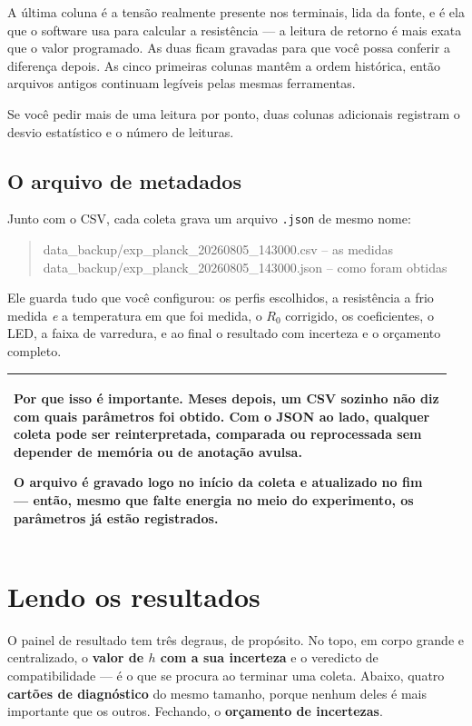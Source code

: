 \documentclass[11pt,a4paper]{article}
\newenvironment{aviso}
  {\par\medskip\noindent\begin{tabular}{|p{0.96\linewidth}|}\hline\rule{0pt}{3ex}}
  {\\[1ex]\hline\end{tabular}\par\medskip}
\begin{document}
A última coluna é a tensão realmente presente nos terminais, lida da fonte, e é
ela que o software usa para calcular a resistência --- a leitura de retorno é
mais exata que o valor programado. As duas ficam gravadas para que você possa
conferir a diferença depois. As cinco primeiras colunas mantêm a ordem
histórica, então arquivos antigos continuam legíveis pelas mesmas ferramentas.

Se você pedir mais de uma leitura por ponto, duas colunas adicionais registram
o desvio estatístico e o número de leituras.

\subsection{O arquivo de metadados}

Junto com o CSV, cada coleta grava um arquivo \texttt{.json} de mesmo nome:

\begin{quote}\ttfamily
data\_backup/exp\_planck\_20260805\_143000.csv \quad -- as medidas\\
data\_backup/exp\_planck\_20260805\_143000.json \quad -- como foram obtidas
\end{quote}

Ele guarda tudo que você configurou: os perfis escolhidos, a resistência a frio
medida \emph{e} a temperatura em que foi medida, o $R_0$ corrigido, os
coeficientes, o LED, a faixa de varredura, e ao final o resultado com incerteza
e o orçamento completo.

\begin{aviso}
\textbf{Por que isso é importante.} Meses depois, um CSV sozinho não diz com
quais parâmetros foi obtido. Com o JSON ao lado, qualquer coleta pode ser
reinterpretada, comparada ou reprocessada sem depender de memória ou de
anotação avulsa.

O arquivo é gravado logo no início da coleta e atualizado no fim --- então,
mesmo que falte energia no meio do experimento, os parâmetros já estão
registrados.
\end{aviso}

\section{Lendo os resultados}
\label{sec:resultados}

O painel de resultado tem três degraus, de propósito. No topo, em corpo grande e
centralizado, o \textbf{valor de $h$ com a sua incerteza} e o veredicto de
compatibilidade --- é o que se procura ao terminar uma coleta. Abaixo, quatro
\textbf{cartões de diagnóstico} do mesmo tamanho, porque nenhum deles é mais
importante que os outros. Fechando, o \textbf{orçamento de incertezas}.
\end{document}
